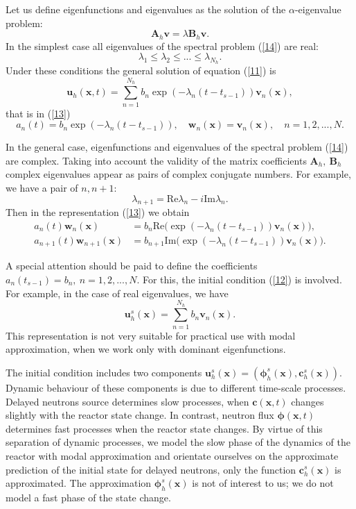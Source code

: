 \documentclass[authoryear]{elsarticle}
\begin{document}
Let us define eigenfunctions and eigenvalues as the solution of the  $\alpha$-eigenvalue problem:
\begin{equation}\label{14}
 \bm A_h \bm v = \lambda  \bm B_h \bm v .
\end{equation} 
In the simplest case all eigenvalues of the spectral problem  (\ref{14}) are real:
\[
 \lambda_1 \leq \lambda_2 \leq ... \leq \lambda_{N_h} .
\] 
Under these conditions \citep{Laub2005,Ortega1987} the general solution of equation  (\ref{11}) is
\begin{equation}\label{15}
 \bm u_h(\bm x, t) =
 \sum_{n=1}^{N_h} b_n \exp(-\lambda_n (t-t_{s-1})) \bm v_n(\bm x) , 
\end{equation} 
that is in (\ref{13}) 
\[
 a_n(t) = b_n \exp(-\lambda_n (t-t_{s-1})) ,
 \quad \bm w_n(\bm x) = \bm v_n(\bm x),
 \quad n = 1,2, ..., N .  
\] 

In the general case, eigenfunctions and eigenvalues of the spectral problem  (\ref{14}) are complex.
Taking into account the validity of the matrix coefficients  $\bm A_h, \ \bm B_h$ complex eigenvalues appear as pairs of complex conjugate numbers. For example, we have a pair of $n,n+1$: 
\[
 \lambda_{n+1} = \mathrm{Re} \lambda_n - i \mathrm{Im} \lambda_n . 
\] 
Then in the representation  (\ref{13}) we obtain
\[
\begin{split}
 a_n(t) \bm w_n(\bm x) & = b_n \mathrm{Re} \big ( \exp(-\lambda_n (t-t_{s-1})) \bm v_n(\bm x) \big ), \\
 a_{n+1}(t) \bm w_{n+1}(\bm x) & = b_{n+1} \mathrm{Im} \big ( \exp(-\lambda_n (t-t_{s-1})) \bm v_n(\bm x) \big ) .
\end{split}
\] 

A special attention should be paid to define the coefficients $a_n(t_{s-1}) = b_n, \ n = 1,2, ..., N$.
For this, the initial condition (\ref{12}) is involved. For example, in the case of real eigenvalues, we have
\[
 \bm u_h^s (\bm x) = \sum_{n=1}^{N_h} b_n \bm v_n(\bm x) .
\] 
This representation is not very suitable for practical use with modal approximation, when we work only with dominant eigenfunctions.  

The initial condition includes two components  $\bm u_h^s (\bm x) = (\bm \phi_h^s (\bm x), \bm c_h^s (\bm x))$.
Dynamic behaviour of these components is due to different time-scale processes. Delayed neutrons source determines slow processes, when  $\bm c(\bm x,t)$ changes slightly with the reactor state change. In contrast, neutron flux $\bm \phi(\bm x,t)$ determines fast processes when the reactor state changes. By virtue of this separation of dynamic processes, we model the slow phase of the dynamics of the reactor with modal approximation and orientate ourselves on the approximate prediction of the initial state for delayed neutrons, only the function  $\bm c_h^s (\bm x)$ is approximated. The approximation  $\bm \phi_h^s (\bm x)$ is not of interest to us; we do not model a fast phase of the state change.
\end{document}
